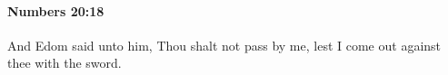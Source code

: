 
		\paragraph{Numbers 20:18} %
			\label{NUMBERS-20-18}

			And Edom said unto him, Thou shalt not pass by me, lest I come out against thee with the sword.


